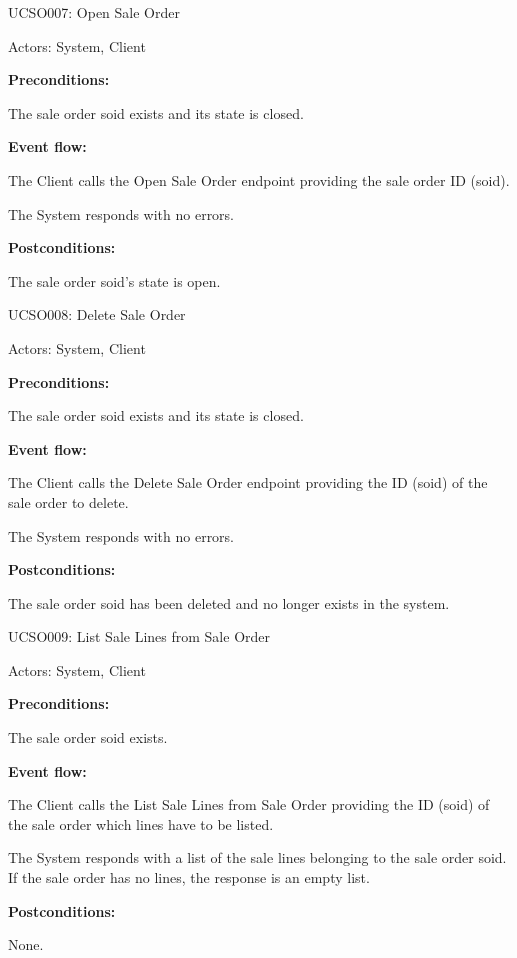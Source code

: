 \begin{ucbox}{UCSO007: Open Sale Order}
\label{UCSO007}

Actors: System, Client

\textbf{Preconditions:}

\ucitem The sale order soid exists and its state is closed.

\textbf{Event flow:}

\ucitem The Client calls the Open Sale Order endpoint providing the sale order ID (soid).

\ucitem The System responds with no errors.

\textbf{Postconditions:}

\ucitem The sale order soid’s state is open.

\end{ucbox}

\begin{ucbox}{UCSO008: Delete Sale Order}
\label{UCSO008}

Actors: System, Client

\textbf{Preconditions:}

\ucitem The sale order soid exists and its state is closed.

\textbf{Event flow:}

\ucitem The Client calls the Delete Sale Order endpoint providing the ID (soid) of the sale order to delete.

\ucitem The System responds with no errors.

\textbf{Postconditions:}

\ucitem The sale order soid has been deleted and no longer exists in the system.

\end{ucbox}

\begin{ucbox}{UCSO009: List Sale Lines from Sale Order}
\label{UCSO009}

Actors: System, Client

\textbf{Preconditions:}

\ucitem The sale order soid exists.

\textbf{Event flow:}

\ucitem The Client calls the List Sale Lines from Sale Order providing the ID (soid) of the sale order which lines have to be listed.

\ucitem The System responds with a list of the sale lines belonging to the sale order soid. If the sale order has no lines, the response is an empty list.

\textbf{Postconditions:}

\ucitem None.

\end{ucbox}

